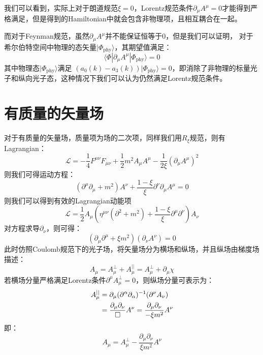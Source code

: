 我们可以看到，实际上对于朗道规范$\xi=0$，Lorentz规范条件$\partial_\mu A^\mu=0$才能得到严格满足，但是得到的Hamiltonian中就会包含非物理项，且相互耦合在一起。

而对于Feynman规范，虽然$\partial_\mu A^\mu$并不能保证恒等于0，但是我们可以证明，
对于希尔伯特空间中物理的态矢量$|\Phi_\text{phy}\rangle $，其期望值满足：
\begin{equation}
\langle \Phi|\partial_\mu A^\mu|\Phi_\text{phy}\rangle = 0
\end{equation}
其中物理态$|\Phi_\text{phy}\rangle$满足 $(a_0(k) - a_3(k))|\Phi_\text{phy}\rangle = 0$，即消除了非物理的标量光子和纵向光子态，这种情况下我们可以认为仍然满足Lorentz规范条件。
\section{有质量的矢量场}
对于有质量的矢量场，质量项为场的二次项，同样我们用$R_\xi$规范，则有Lagrangian：
\begin{equation}
\mathscr{L}=-\frac{1}{4}F^{\mu\nu}F_{\mu\nu}+\frac{1}{2}m^2 A_\mu A^\mu-\frac{1}{2\xi}(\partial_\mu A^\mu)^2
\end{equation}
则我们可得运动方程：
\begin{equation}
(\partial^\mu\partial_\mu+m^2) A^\nu+\frac{1-\xi}{\xi}\partial^\nu\partial_\mu A^\mu=0
\end{equation}
则我们可以得到有效的Lagrangian动能项
\begin{equation}
    \mathscr{L}=\frac{1}{2}A_\mu\left( \eta^{\mu\nu}(\partial^2+m^2) + \frac{1-\xi}{\xi}\partial^\mu \partial^\nu \right) A_\nu
\end{equation}
对方程求导$\partial_\nu$，则可得：
\begin{equation}
(\partial_\mu\partial^\mu+\xi m^2)(\partial_\nu A^\nu)=0
\end{equation}
此时仿照Coulomb规范下的光子场，将矢量场分为横场和纵场，并且纵场由梯度场描述：
\begin{equation}
A_\mu=A^\bot_\mu+A^{||}_\mu=A^{\bot}_\mu+\partial_\mu\chi
\end{equation}
若横场分量严格满足Lorentz条件$\partial^\mu A^\bot_\mu=0$，则纵场分量可表示为：
\begin{align}
A^{||}_\mu&=\partial_\mu(\partial^\alpha\partial_\alpha)^{-1}(\partial^\nu A_\nu)\notag\\
&=\frac{\partial_\mu\partial_\nu}{\Box} A^\nu=\frac{\partial_\mu\partial_\nu}{-\xi m^2} A^\nu
\end{align}
即：
\begin{equation}
A_\mu=A^\bot_\mu-\frac{\partial_\mu\partial_\nu}{\xi m^2} A^\nu
\end{equation}
